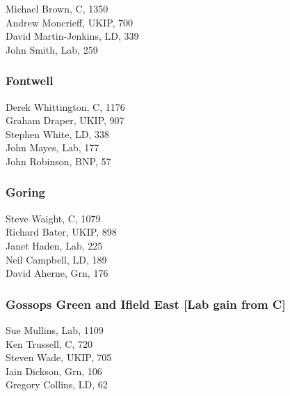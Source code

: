 \documentclass[a4paper,openany,10pt]{book}
\begin{document}
Michael Brown, C, 1350\\
Andrew Moncrieff, UKIP, 700\\
David Martin-Jenkins, LD, 339\\
John Smith, Lab, 259\\


\subsubsection*{Fontwell}



Derek Whittington, C, 1176\\
Graham Draper, UKIP, 907\\
Stephen White, LD, 338\\
John Mayes, Lab, 177\\
John Robinson, BNP, 57\\


\subsubsection*{Goring}



Steve Waight, C, 1079\\
Richard Bater, UKIP, 898\\
Janet Haden, Lab, 225\\
Neil Campbell, LD, 189\\
David Aherne, Grn, 176\\


\subsubsection*{Gossops Green and Ifield East \hspace*{\fill}\nolinebreak[1]%
\enspace\hspace*{\fill}
[Lab gain from C]}



Sue Mullins, Lab, 1109\\
Ken Trussell, C, 720\\
Steven Wade, UKIP, 705\\
Iain Dickson, Grn, 106\\
Gregory Collins, LD, 62\\
\end{document}
